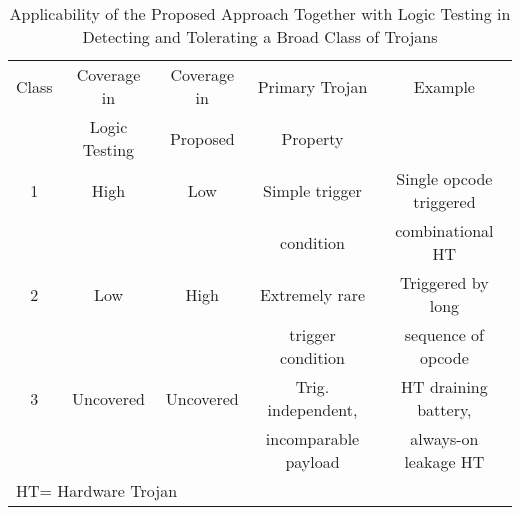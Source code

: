 \documentclass[conference]{IEEEtran}
\begin{document}
 \begin{table}[!t]
 \begin{center}
        \scriptsize\addtolength{\tabcolsep}{-2.5pt}
\renewcommand{\arraystretch}{1}
\centering
\caption{Applicability of the Proposed Approach Together with Logic Testing in Detecting and Tolerating a Broad Class of Trojans}
\label{trojan_class}

\begin{tabular}{c|c|c|c|c} 
\toprule
\hline
Class   &  Coverage in & Coverage in   & Primary Trojan  & Example \\
 		 &  Logic Testing    & Proposed            & Property    &                \\ \hline
 1       & High                 & Low                 & Simple trigger     & Single opcode triggered           \\ 
         &                    &                     &  condition &          combinational HT       \\ \hline
 2      & Low                & High               & Extremely rare  &   Triggered by long  \\ 
         &                    &                &     trigger condition   &  sequence of opcode\\ \hline
 3      & Uncovered           & Uncovered & Trig. independent, & HT draining battery,      \\ 
         &                   &      &   incomparable payload  &    always-on leakage HT                 \\ \hline

\bottomrule
 \multicolumn{3}{l}{HT= Hardware Trojan}

\end{tabular}
 \end{center}
 \end{table}
\end{document}
